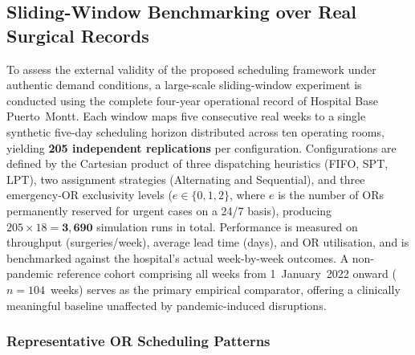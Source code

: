 \documentclass[sn-mathphys-num]{sn-jnl}
\begin{document}

\subsection{Sliding-Window Benchmarking over Real Surgical Records}\label{sec:sliding-windows}

To assess the external validity of the proposed scheduling framework
under authentic demand conditions, a large-scale sliding-window
experiment is conducted using the complete four-year operational record
of Hospital Base Puerto~Montt. Each window maps five consecutive real
weeks to a single synthetic five-day scheduling horizon distributed
across ten operating rooms, yielding \textbf{205 independent
replications} per configuration. Configurations are defined by the
Cartesian product of three dispatching heuristics (FIFO, SPT, LPT),
two assignment strategies (Alternating and Sequential), and three
emergency-OR exclusivity levels ($e \in \{0,1,2\}$, where $e$ is the
number of ORs permanently reserved for urgent cases on a 24/7 basis),
producing $205 \times 18 = \mathbf{3{,}690}$ simulation runs in total.
Performance is measured on throughput (surgeries/week), average lead
time (days), and OR utilisation, and is benchmarked against the
hospital's actual week-by-week outcomes. A non-pandemic reference cohort
comprising all weeks from 1~January~2022 onward ($n = 104$~weeks) serves
as the primary empirical comparator, offering a clinically meaningful
baseline unaffected by pandemic-induced disruptions.

\subsubsection{Representative OR Scheduling Patterns}
\end{document}
